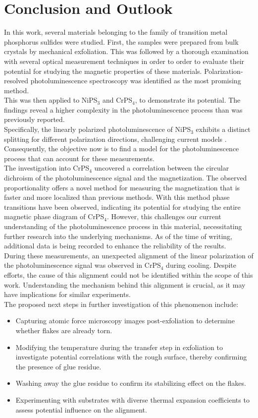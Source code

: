 \documentclass[
	twoside,
	parskip=half,
	a4paper,
]{scrbook}
\begin{document}
\chapter{Conclusion and Outlook}
In this work, several materials belonging to the family of transition metal phosphorus sulfides were studied.
First, the samples were prepared from bulk crystals by mechanical exfoliation.
This was followed by a thorough examination with several optical measurement techniques in order to order to evaluate their potential for studying the magnetic properties of these materials.
Polarization-resolved photoluminescence spectroscopy was identified as the most promising method.\\
This was then applied to NiPS$_3$ and CrPS$_4$, to demonstrate its potential.
The findings reveal a higher complexity in the photoluminescence process than was previously reported.\\
Specifically, the linearly polarized photoluminescence of NiPS$_3$ exhibits a distinct splitting for different polarization directions, challenging current models \cite{NiPS3_magnon_gap,NiPS3_linear,NiPS3_coherent}.
Consequently, the objective now is to find a model for the photoluminescence process that can account for these measurements.\\
The investigation into CrPS$_4$ uncovered a correlation between the circular dichroism of the photoluminescence signal and the magnetization.
The observed proportionality offers a novel method for measuring the magnetization that is faster and more localized than previous methods.
With this method phase transitions have been observed, indicating its potential for studying the entire magnetic phase diagram of CrPS$_4$.
However, this challenges our current understanding of the photoluminescence process in this material, necessitating further research into the underlying mechanisms.
As of the time of writing, additional data is being recorded to enhance the reliability of the results.\\
During these measurements, an unexpected alignment of the linear polarization of the photoluminescence signal was observed in CrPS$_4$ during cooling.
Despite efforts, the cause of this alignment could not be identified within the scope of this work.
Understanding the mechanism behind this alignment is crucial, as it may have implications for similar experiments.\\
The proposed next steps in further investigation of this phenomenon include:
\begin{itemize}
	\setlength\itemsep{-0.5em}
	\item Capturing atomic force microscopy images post-exfoliation to determine whether flakes are already torn.
	\item Modifying the temperature during the transfer step in exfoliation to investigate potential correlations with the rough surface, thereby confirming the presence of glue residue.
	\item Washing away the glue residue to confirm its stabilizing effect on the flakes.
	\item Experimenting with substrates with diverse thermal expansion coefficients to assess potential influence on the alignment.
\end{itemize}
\end{document}
